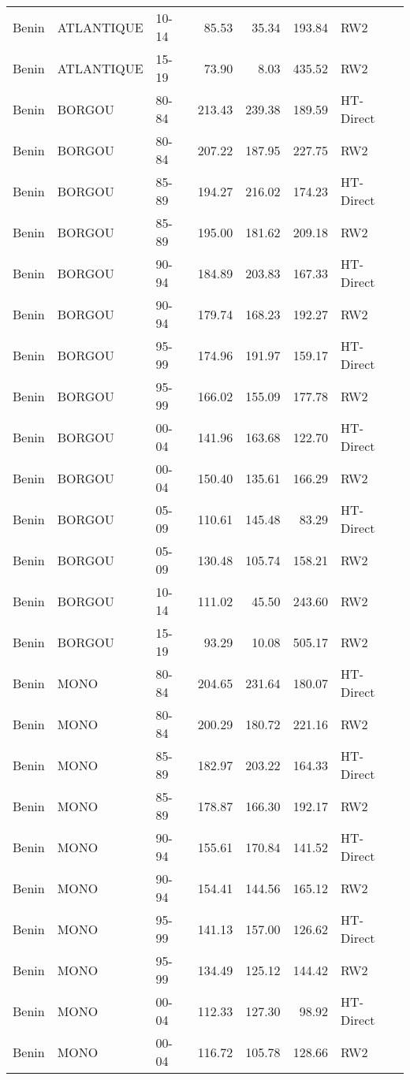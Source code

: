 \begin{longtable}{lllrrrl}
  Benin & ATLANTIQUE & 10-14 & 85.53 & 35.34 & 193.84 & RW2 \\ 
  Benin & ATLANTIQUE & 15-19 & 73.90 & 8.03 & 435.52 & RW2 \\ 
  Benin & BORGOU & 80-84 & 213.43 & 239.38 & 189.59 & HT-Direct \\ 
  Benin & BORGOU & 80-84 & 207.22 & 187.95 & 227.75 & RW2 \\ 
  Benin & BORGOU & 85-89 & 194.27 & 216.02 & 174.23 & HT-Direct \\ 
  Benin & BORGOU & 85-89 & 195.00 & 181.62 & 209.18 & RW2 \\ 
  Benin & BORGOU & 90-94 & 184.89 & 203.83 & 167.33 & HT-Direct \\ 
  Benin & BORGOU & 90-94 & 179.74 & 168.23 & 192.27 & RW2 \\ 
  Benin & BORGOU & 95-99 & 174.96 & 191.97 & 159.17 & HT-Direct \\ 
  Benin & BORGOU & 95-99 & 166.02 & 155.09 & 177.78 & RW2 \\ 
  Benin & BORGOU & 00-04 & 141.96 & 163.68 & 122.70 & HT-Direct \\ 
  Benin & BORGOU & 00-04 & 150.40 & 135.61 & 166.29 & RW2 \\ 
  Benin & BORGOU & 05-09 & 110.61 & 145.48 & 83.29 & HT-Direct \\ 
  Benin & BORGOU & 05-09 & 130.48 & 105.74 & 158.21 & RW2 \\ 
  Benin & BORGOU & 10-14 & 111.02 & 45.50 & 243.60 & RW2 \\ 
  Benin & BORGOU & 15-19 & 93.29 & 10.08 & 505.17 & RW2 \\ 
  Benin & MONO & 80-84 & 204.65 & 231.64 & 180.07 & HT-Direct \\ 
  Benin & MONO & 80-84 & 200.29 & 180.72 & 221.16 & RW2 \\ 
  Benin & MONO & 85-89 & 182.97 & 203.22 & 164.33 & HT-Direct \\ 
  Benin & MONO & 85-89 & 178.87 & 166.30 & 192.17 & RW2 \\ 
  Benin & MONO & 90-94 & 155.61 & 170.84 & 141.52 & HT-Direct \\ 
  Benin & MONO & 90-94 & 154.41 & 144.56 & 165.12 & RW2 \\ 
  Benin & MONO & 95-99 & 141.13 & 157.00 & 126.62 & HT-Direct \\ 
  Benin & MONO & 95-99 & 134.49 & 125.12 & 144.42 & RW2 \\ 
  Benin & MONO & 00-04 & 112.33 & 127.30 & 98.92 & HT-Direct \\ 
  Benin & MONO & 00-04 & 116.72 & 105.78 & 128.66 & RW2 \\ 

\end{longtable}
